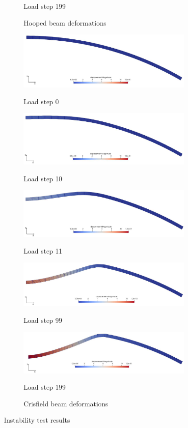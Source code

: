 \documentclass[11pt,a4paper,final]{article}
\begin{document}
\begin{figure}[ht!]
\begin{subfigure}[b]{0.49\textwidth}
\caption*{Load step 199}
\caption{Hooped beam deformations}
\label{fig:1.15.1}
\end{subfigure}
\begin{subfigure}[b]{0.49\textwidth}
\centering
\includegraphics[width=0.95\textwidth]{crisfield_beam_ls_0.pdf}
\caption*{Load step 0}
\vspace{1cm}
\centering
\includegraphics[width=0.95\textwidth]{crisfield_beam_ls_10.pdf}
\caption*{Load step 10}
\vspace{1cm}
\centering
\includegraphics[width=0.95\textwidth]{crisfield_beam_ls_11.pdf}
\caption*{Load step 11}
\vspace{1cm}
\centering
\includegraphics[width=0.95\textwidth]{crisfield_beam_ls_99.pdf}
\caption*{Load step 99}
\vspace{1cm}
\centering
\includegraphics[width=0.95\textwidth]{crisfield_beam_ls_199.pdf}
\caption*{Load step 199}
\caption{Crisfield beam deformations}
\label{fig:1.15.2}
\end{subfigure}
\caption{Instability test results}
\label{fig:1.15}
\end{figure}
\end{document}

